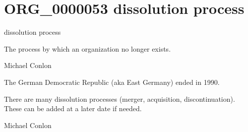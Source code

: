 \documentclass[letterpaper,10pt,english]{sphinxmanual}
\begin{document}
\section{ORG\_0000053 \sphinxhyphen{} dissolution process}
\label{\detokenize{doc-ORG_0000053:org-0000053-dissolution-process}}\label{\detokenize{doc-ORG_0000053:index-0}}\label{\detokenize{doc-ORG_0000053::doc}}
\begin{sphinxShadowBox}

\sphinxAtStartPar
dissolution process
\end{sphinxShadowBox}

\begin{sphinxShadowBox}

\sphinxAtStartPar
The process by which an organization no longer exists.
\end{sphinxShadowBox}

\begin{sphinxShadowBox}

\sphinxAtStartPar
Michael Conlon 
\end{sphinxShadowBox}

\begin{sphinxShadowBox}

\sphinxAtStartPar
The German Democratic Republic (aka East Germany) ended in 1990.
\end{sphinxShadowBox}

\begin{sphinxShadowBox}

\sphinxAtStartPar
There are many dissolution processes (merger, acquisition, discontinuation).  These can be added at a later date if needed.
\end{sphinxShadowBox}

\begin{sphinxShadowBox}

\sphinxAtStartPar
Michael Conlon 
\end{sphinxShadowBox}
\begin{quote}
\label{\detokenize{doc-ORG_0000054:org-0000054}}\label{\detokenize{doc-ORG_0000054:dissolution-process-boundary}}\label{\detokenize{doc-ORG_0000054:org-0000054}}
\ignorespaces \end{quote}
\end{document}
